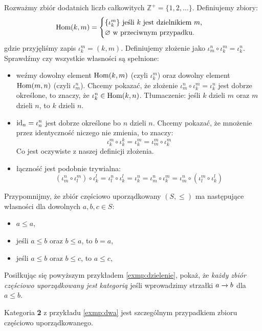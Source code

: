 \begin{exmp}
  \label{exmp:dzielenie}
  {\newcommand{\divs}[2]{\iota_{#1}^{#2}}
  Rozważmy zbiór dodatnich liczb całkowitych $\mathbb Z^+=\{1, 2, \dots\}$. Definiujemy zbiory:
  $$
  \Mor km =
  \begin{cases}
    \{ \divs km \} \text{ jeśli $k$ jest dzielnikiem $m$,}\\
    \varnothing \text{ w przeciwnym przypadku.}
  \end{cases}
  $$
  gdzie przyjęliśmy zapis $\divs km=(k, m)$.
  Definiujemy złożenie jako $\divs mn  \circ  \divs km = \divs kn$.
  Sprawdźmy czy wszystkie własności są spełnione:
  \begin{itemize}
    \item weźmy dowolny element $\textrm{Hom}(k, m)$ (czyli $\divs km$) oraz dowolny element $\textrm{Hom}(m, n)$ (czyli $\divs mn$). Chcemy pokazać, że złożenie $\divs mn \circ \divs km = \divs kn$ jest dobrze określone, to znaczy, że $\divs kn \in \Mor kn$. Tłumaczenie: jeśli $k$ dzieli $m$ oraz $m$ dzieli $n$, to $k$ dzieli $n$.
    \item $\id n = \divs nn$ jest dobrze określone bo $n$ dzieli $n$. Chcemy pokazać, że mnożenie przez identyczność niczego nie zmienia, to znaczy:
      $$\divs km \circ \divs kk = \divs km = \divs mm \circ \divs km$$
      Co jest oczywiste z naszej definicji złożenia.
    \item łączność jest podobnie trywialna:
      $$(\divs mn \circ \divs lm) \circ  \divs kl  = \divs ln \circ \divs kl = \divs kn = \divs mn \circ \divs km = \divs mn \circ (\divs lm \circ  \divs kl)$$
  \end{itemize}
  }
\end{exmp}

\begin{exc}
  Przypomnijmy, że zbiór częściowo uporządkowany $(S, \le)$ ma następujące własności dla dowolnych $a, b, c \in S$:
  \begin{itemize}
    \item $a\le a$,
    \item jeśli $a\le b$ oraz $b\le a$, to $b=a$,
    \item jeśli $a\le b$ oraz $b\le c$, to $a\le c$,
  \end{itemize}
  Posiłkując się powyższym przykładem \ref{exmp:dzielenie}, pokaż, że \emph{każdy zbiór częściowo uporządkowany jest kategorią} jeśli wprowadzimy strzałki $a \xrightarrow{} b$ dla $a\le b$.
\end{exc}

\begin{exmp}
    Kategoria \textbf{2} z przykładu \ref{exmp:dwa} jest szczególnym przypadkiem zbioru częściowo uporządkowanego.
\end{exmp}

